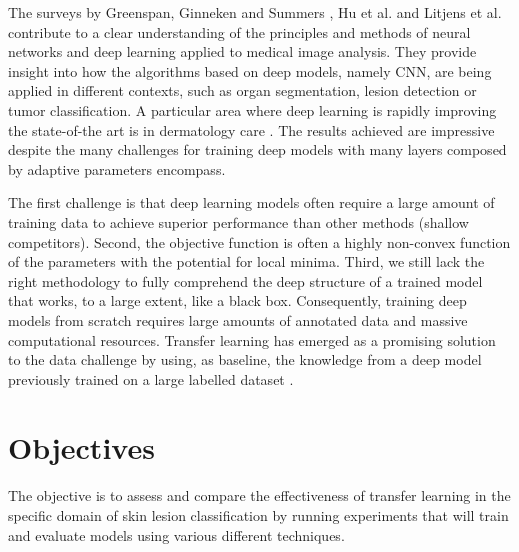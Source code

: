 The surveys by Greenspan, Ginneken and Summers \cite{intro1}, Hu et al. \cite{intro2} and Litjens et al. \cite{intro3} contribute to a clear understanding of the principles and methods of neural networks and deep learning applied to medical image analysis. They provide insight into how the algorithms based on deep models, namely \ac{CNN}, are being applied in different contexts, such as organ segmentation, lesion detection or tumor classification. A particular area where deep learning is rapidly improving the state-of-the art is in dermatology care \cite{nature2017}\cite{intro5}\cite{intro6}. The results achieved are impressive despite the many challenges for training deep models with many layers composed by adaptive parameters encompass.

The first challenge is that deep learning models often require a large amount of training data to achieve superior performance than other methods (shallow competitors). Second, the objective function is often a highly non-convex function of the parameters with the potential for local minima. Third, we still lack the right methodology to fully comprehend the deep structure of a trained model that works, to a large extent, like a black box. Consequently, training deep models from scratch requires large amounts of annotated data and massive computational resources. Transfer learning has emerged as a promising solution to the data challenge by using, as baseline, the knowledge from a deep model previously trained on a large labelled dataset \cite{intro7}\cite{howtransferable}\cite{intro9}.

\section{Objectives}

The objective is to assess and compare the effectiveness of transfer learning in the specific domain of skin lesion classification by running experiments that will train and evaluate models using various different techniques.

